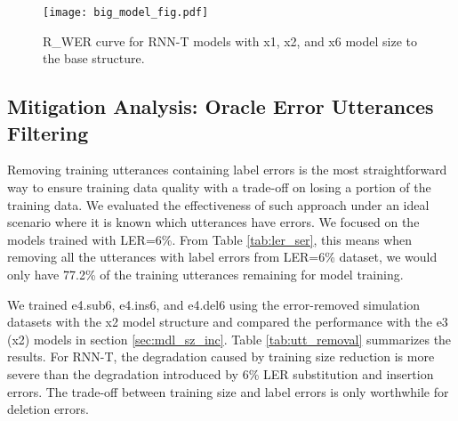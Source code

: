 \documentclass{article}
\begin{document}
\begin{figure}[h]
	\centering
	\texttt{[image: big\_model\_fig.pdf]} 
	\caption{R\_WER curve for RNN-T models with x1, x2, and x6 model size to the base structure.}
	\label{fig:exp3}
\end{figure}


\subsection{Mitigation Analysis: Oracle Error Utterances Filtering}

Removing training utterances containing label errors is the most straightforward way to ensure training data quality with a trade-off on losing a portion of the training data. We evaluated the effectiveness of such approach under an ideal scenario where it is known which utterances have errors. We focused on the models trained with LER=6\%. From Table \ref{tab:ler_ser}, this means when removing all the utterances with label errors from LER=6\% dataset, we would only have 77.2\% of the training utterances remaining for model training.

We trained e4.sub6, e4.ins6, and e4.del6 using the error-removed simulation datasets with the x2 model structure and compared the performance with the e3 (x2) models in section \ref{sec:mdl_sz_inc}. Table \ref{tab:utt_removal} summarizes the results. For RNN-T, the degradation caused by training size reduction is more severe than the degradation introduced by 6\% LER substitution and insertion errors. The trade-off between training size and label errors is only worthwhile for deletion errors.
\end{document}
